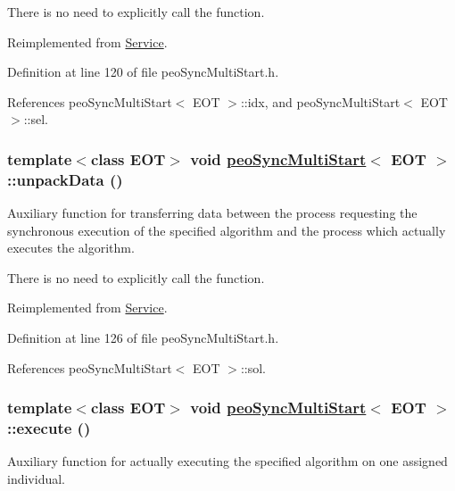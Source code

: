 There is no need to explicitly call the function. 

Reimplemented from \hyperlink{classService_aea4b8f7f8fb88e83862ee4bfd9ab207}{Service}.

Definition at line 120 of file peo\-Sync\-Multi\-Start.h.

References peo\-Sync\-Multi\-Start$<$ EOT $>$::idx, and peo\-Sync\-Multi\-Start$<$ EOT $>$::sel.\hypertarget{classpeoSyncMultiStart_2903a441b77cded266b5fb651e17a5b5}{
\subsubsection[unpackData]{\setlength{\rightskip}{0pt plus 5cm}template$<$class EOT$>$ void \hyperlink{classpeoSyncMultiStart}{peo\-Sync\-Multi\-Start}$<$ EOT $>$::unpack\-Data ()}}
\label{classpeoSyncMultiStart_2903a441b77cded266b5fb651e17a5b5}


Auxiliary function for transferring data between the process requesting the synchronous execution of the specified algorithm and the process which actually executes the algorithm. 

There is no need to explicitly call the function. 

Reimplemented from \hyperlink{classService_3bd87b444710813d30fd754d4d0b4df3}{Service}.

Definition at line 126 of file peo\-Sync\-Multi\-Start.h.

References peo\-Sync\-Multi\-Start$<$ EOT $>$::sol.\hypertarget{classpeoSyncMultiStart_a4d1c2943c290de540800087b54dc49b}{
\subsubsection[execute]{\setlength{\rightskip}{0pt plus 5cm}template$<$class EOT$>$ void \hyperlink{classpeoSyncMultiStart}{peo\-Sync\-Multi\-Start}$<$ EOT $>$::execute ()}}
\label{classpeoSyncMultiStart_a4d1c2943c290de540800087b54dc49b}


Auxiliary function for actually executing the specified algorithm on one assigned individual. 

